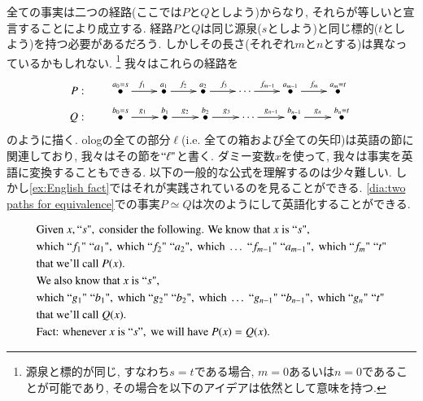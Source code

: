 全ての事実は二つの経路(ここでは$P$と$Q$としよう)からなり, それらが等しいと宣言することにより成立する. 経路$P$と$Q$は同じ源泉($s$としよう)と同じ標的($t$としよう)を持つ必要があるだろう. しかしその長さ(それぞれ$m$と$n$とする)は異なっているかもしれない.
\footnote{源泉と標的が同じ, すなわち$s=t$である場合, $m=0$あるいは$n=0$であることが可能であり, その場合を以下のアイデアは依然として意味を持つ.} 
我々はこれらの経路を
\begin{align}\label{dia:two paths for equivalence}
P:&\hsp\xymatrix@=22pt{\LMO{a_0=s}\ar[r]^{f_1}&\LMO{a_1}\ar[r]^{f_2}&\LMO{a_2}\ar[r]^{f_3}&\cdots\ar[r]^{f_{m-1}}&\LMO{a_{m-1}}\ar[r]^{f_m}&\LMO{a_m=t}}\\\nonumber
Q:&\hsp\xymatrix@=23pt{\LMO{b_0=s}\ar[r]^{g_1}&\LMO{b_1}\ar[r]^{g_2}&\LMO{b_2}\ar[r]^{g_3}&\cdots\ar[r]^{g_{n-1}}&\LMO{b_{n-1}}\ar[r]^{g_n}&\LMO{b_n=t}}
\end{align}
のように描く.
ologの全ての部分$\ell$(i.e. 全ての箱および全ての矢印)は英語の節に関連しており, 我々はその節を$\qt{\ell}$と書く. ダミー変数$x$を使って, 我々は事実を英語に変換することもできる. 以下の一般的な公式を理解するのは少々難しい. しかし\ref{ex:English fact}ではそれが実践されているのを見ることができる. \eqref{dia:two paths for equivalence}での事実$P\simeq Q$は次のようにして英語化することができる.

\begin{align}\label{dia:Englishification}\index{Englishification}
&\tn{Given }x,\qt{s},\tn{ consider the following. We know that }x\tn{ is }\qt{s}, \\
\nonumber&\tn {which } \qt{f_1}\;\qt{a_1}, \tn{ which } \qt{f_2}\;\qt{a_2}, \tn { which }\ldots \; \qt{f_{m-1}}\;\qt{a_{m-1}}, \tn { which } \qt{f_m}\;\qt{t}\\
\nonumber&\tn{that we'll call } P(x).\\
\nonumber&\tn{We also know that }x\tn{ is } \qt{s},\\
\nonumber&\tn {which } \qt{g_1}\;\qt{b_1}, \tn{ which }\qt{g_2}\;\qt{b_2}, \tn { which }\ldots\;\qt{g_{n-1}}\;\qt{b_{n-1}}, \tn { which } \qt{g_n}\;\qt{t}\\
\nonumber&\tn{that we'll call } Q(x).\\
\nonumber&\tn{Fact: whenever }x\tn{ is }``s",\tn{ we will have }P(x)=Q(x).
\end{align}

